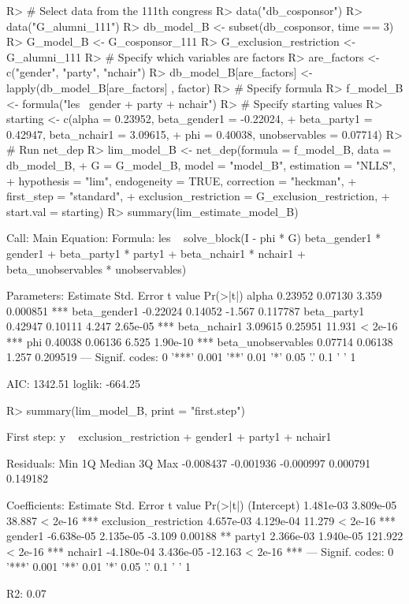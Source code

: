 \documentclass[nojss]{jss}
\begin{document}
	\begin{CodeChunk}
		\begin{CodeInput}
			R> # Select data from the 111th congress
			R> data("db_cosponsor")
			R> data("G_alumni_111")
			R> db_model_B <- subset(db_cosponsor, time == 3)
			R> G_model_B <- G_cosponsor_111
			R> G_exclusion_restriction <- G_alumni_111
			R> # Specify which variables are factors
			R> are_factors <- c("gender", "party", "nchair")
			R> db_model_B[are_factors] <- lapply(db_model_B[are_factors] , factor)
			R> # Specify formula
			R> f_model_B <- formula("les ~gender + party + nchair")
			R> # Specify starting values
			R> starting <- c(alpha = 0.23952, beta_gender1 = -0.22024,
			+    beta_party1 = 0.42947, beta_nchair1 = 3.09615,
			+    phi = 0.40038, unobservables = 0.07714)
			R> # Run net_dep
			R> lim_model_B <- net_dep(formula = f_model_B, data = db_model_B,
			+    G = G_model_B, model = "model_B", estimation = "NLLS",
			+    hypothesis = "lim", endogeneity = TRUE, correction = "heckman",
			+    first_step = "standard", 
			+    exclusion_restriction = G_exclusion_restriction, 
			+    start.val = starting)
			R> summary(lim_estimate_model_B)
		\end{CodeInput}
		\begin{CodeOutput}
			Call:
			Main Equation:  
			Formula: les ~ solve_block(I - phi * G) %
			beta_gender1 * gender1 + beta_party1 * party1 + 
			beta_nchair1 * nchair1 + beta_unobservables * unobservables)
			
			Parameters:
			Estimate Std. Error t value Pr(>|t|)    
			alpha               0.23952    0.07130   3.359 0.000851 ***
			beta_gender1       -0.22024    0.14052  -1.567 0.117787    
			beta_party1         0.42947    0.10111   4.247 2.65e-05 ***
			beta_nchair1        3.09615    0.25951  11.931  < 2e-16 ***
			phi                 0.40038    0.06136   6.525 1.90e-10 ***
			beta_unobservables  0.07714    0.06138   1.257 0.209519    
			---
			Signif. codes:  0 '***' 0.001 '**' 0.01 '*' 0.05 '.' 0.1 ' ' 1
			
			AIC: 1342.51  loglik: -664.25
		\end{CodeOutput}
		\begin{CodeInput}
			R> summary(lim_model_B, print = "first.step")
		\end{CodeInput}
		\begin{CodeOutput}
			First step:  y ~ exclusion_restriction + gender1 + party1 + nchair1
			
			Residuals:
			Min        1Q    Median        3Q       Max 
			-0.008437 -0.001936 -0.000997  0.000791  0.149182 
			
			Coefficients:
			Estimate Std. Error t value Pr(>|t|)    
			(Intercept)            1.481e-03  3.809e-05  38.887  < 2e-16 ***
			exclusion_restriction  4.657e-03  4.129e-04  11.279  < 2e-16 ***
			gender1               -6.638e-05  2.135e-05  -3.109  0.00188 ** 
			party1                 2.366e-03  1.940e-05 121.922  < 2e-16 ***
			nchair1               -4.180e-04  3.436e-05 -12.163  < 2e-16 ***
			---
			Signif. codes:  0 '***' 0.001 '**' 0.01 '*' 0.05 '.' 0.1 ' ' 1
			
			R2: 0.07
		\end{CodeOutput}
	\end{CodeChunk}
\end{document}
